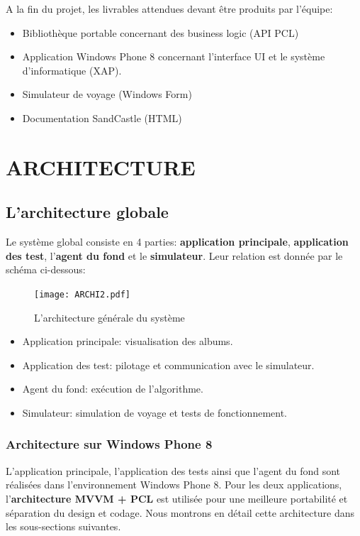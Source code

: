 \documentclass{article}
\begin{document}
A la fin du projet, les livrables attendues devant être produits par l'équipe:
\begin{itemize}
\item Bibliothèque portable concernant des business logic (API PCL)
\item Application Windows Phone 8 concernant l'interface UI et le système d'informatique (XAP).
\item Simulateur de voyage (Windows Form)
\item Documentation SandCastle (HTML)
\end{itemize}


\newpage
\section{\LARGE ARCHITECTURE}

\vspace{0.2 cm}
\subsection{\Large L'architecture globale}

Le système global consiste en 4 parties: \textbf{application principale}, \textbf{application des test}, l'\textbf{agent du fond} et le \textbf{simulateur}. Leur relation est donnée par le schéma ci-dessous:
\begin{figure}[h!]
\centering
\texttt{[image: ARCHI2.pdf]}
\caption{L'architecture générale du système}
\end{figure}

\begin{itemize}
\item Application principale: visualisation des albums.
\item Application des test: pilotage et communication avec le simulateur.
\item Agent du fond:  exécution de l'algorithme.
\item Simulateur: simulation de voyage et tests de fonctionnement.
\end{itemize}

\vspace{0.2 cm}
\subsubsection{\large Architecture sur Windows Phone 8}
L'application principale, l'application des tests ainsi que l'agent du fond sont réalisées dans l'environnement Windows Phone 8. Pour les deux applications, l'\textbf{architecture MVVM + PCL} est utilisée pour une meilleure portabilité et séparation du design et codage. Nous montrons en détail cette architecture dans les sous-sections suivantes.
\end{document}
